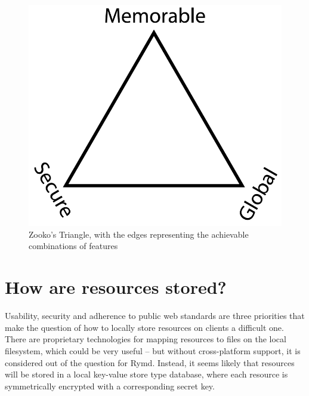 \begin{figure}[h]
\centering
\includegraphics[width=\textwidth,height=0.2\paperheight,keepaspectratio
]{figures/Zooko_s_Triangle}
\caption{Zooko's Triangle, with the edges representing the achievable combinations of features \cite{Zooko:2001:Online}}
\label{fig:zooko}
\end{figure}

\section {How are resources stored?}
Usability, security and adherence to public web standards are three priorities that make the question of how to locally store resources on clients a difficult one. There are proprietary technologies for mapping resources to files on the local filesystem, which could be very useful – but without cross-platform support, it is considered out of the question for Rymd. Instead, it seems likely that resources will be stored in a local key-value store type database, where each resource is symmetrically encrypted with a corresponding secret key.

